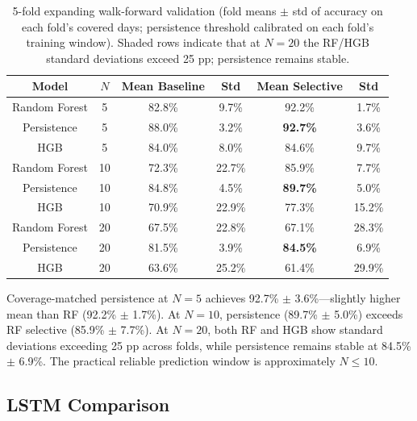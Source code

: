 \documentclass[12pt]{article}
\begin{document}
\begin{table}[H]
\centering
\caption{5-fold expanding walk-forward validation (fold means $\pm$ std of accuracy on each
fold's covered days; persistence threshold calibrated on each fold's training window). Shaded
rows indicate that at $N = 20$ the RF/HGB standard deviations exceed 25 pp; persistence
remains stable.}
\label{tab:wf}
\begin{tabular}{cccccc}
\toprule
Model & $N$ & Mean Baseline & Std & Mean Selective & Std \\
\midrule
Random Forest    & 5  & 82.8\% & 9.7\%  & 92.2\% & 1.7\%  \\
Persistence      & 5  & 88.0\% & 3.2\%  & \textbf{92.7\%} & 3.6\%  \\
HGB              & 5  & 84.0\% & 8.0\%  & 84.6\% & 9.7\%  \\
\midrule
Random Forest    & 10 & 72.3\% & 22.7\% & 85.9\% & 7.7\%  \\
Persistence      & 10 & 84.8\% & 4.5\%  & \textbf{89.7\%} & 5.0\%  \\
HGB              & 10 & 70.9\% & 22.9\% & 77.3\% & 15.2\% \\
\midrule
\rowcolor[gray]{0.9}
Random Forest    & 20 & 67.5\% & 22.8\% & 67.1\% & 28.3\% \\
Persistence      & 20 & 81.5\% & 3.9\%  & \textbf{84.5\%} & 6.9\%  \\
\rowcolor[gray]{0.9}
HGB              & 20 & 63.6\% & 25.2\% & 61.4\% & 29.9\% \\
\bottomrule
\end{tabular}
\end{table}

Coverage-matched persistence at $N = 5$ achieves 92.7\% $\pm$ 3.6\%---slightly higher mean
than RF (92.2\% $\pm$ 1.7\%). At $N = 10$, persistence (89.7\% $\pm$ 5.0\%) exceeds RF
selective (85.9\% $\pm$ 7.7\%). At $N = 20$, both RF and HGB show standard deviations
exceeding 25 pp across folds, while persistence remains stable at 84.5\% $\pm$ 6.9\%. The
practical reliable prediction window is approximately $N \leq 10$.

\subsection{LSTM Comparison}
\label{sec:lstm}
\end{document}
